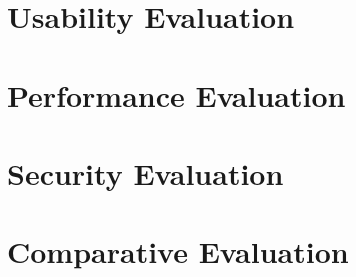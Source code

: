 \section{Usability Evaluation}

\section{Performance Evaluation}

\section{Security Evaluation}

\section{Comparative Evaluation}